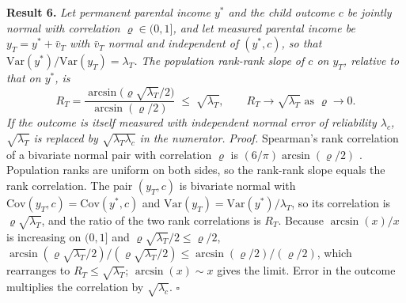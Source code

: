 \documentclass[11pt]{article}
\begin{document}
\noindent\textbf{Result 6.} \emph{Let permanent parental income $y^*$ and the child outcome $c$ be jointly normal with correlation $\varrho \in (0,1]$, and let measured parental income be $y_T = y^* + \bar v_T$ with $\bar v_T$ normal and independent of $(y^*, c)$, so that $\mathrm{Var}(y^*)/\mathrm{Var}(y_T) = \lambda_T$. The population rank-rank slope of $c$ on $y_T$, relative to that on $y^*$, is}
\begin{equation}
R_T = \frac{\arcsin\!\big(\varrho\sqrt{\lambda_T}/2\big)}{\arcsin(\varrho/2)} \;\le\; \sqrt{\lambda_T}, \qquad R_T \to \sqrt{\lambda_T} \text{ as } \varrho \to 0 .
\label{eq:app-rank}
\end{equation}
\emph{If the outcome is itself measured with independent normal error of reliability $\lambda_c$, $\sqrt{\lambda_T}$ is replaced by $\sqrt{\lambda_T\lambda_c}$ in the numerator.}
\proofskip
\noindent\emph{Proof.} Spearman's rank correlation of a bivariate normal pair with correlation $\varrho$ is $(6/\pi)\arcsin(\varrho/2)$ \citep{Pearson1907, Kruskal1958}. Population ranks are uniform on both sides, so the rank-rank slope equals the rank correlation. The pair $(y_T, c)$ is bivariate normal with $\mathrm{Cov}(y_T, c) = \mathrm{Cov}(y^*, c)$ and $\mathrm{Var}(y_T) = \mathrm{Var}(y^*)/\lambda_T$, so its correlation is $\varrho\sqrt{\lambda_T}$, and the ratio of the two rank correlations is $R_T$. Because $\arcsin(x)/x$ is increasing on $(0, 1]$ and $\varrho\sqrt{\lambda_T}/2 \le \varrho/2$, $\arcsin(\varrho\sqrt{\lambda_T}/2)/(\varrho\sqrt{\lambda_T}/2) \le \arcsin(\varrho/2)/(\varrho/2)$, which rearranges to $R_T \le \sqrt{\lambda_T}$; $\arcsin(x) \sim x$ gives the limit. Error in the outcome multiplies the correlation by $\sqrt{\lambda_c}$. \hfill$\square$
\end{document}
